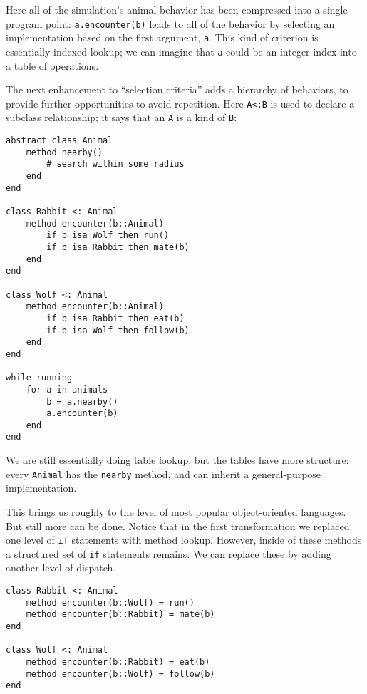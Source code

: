 Here all of the simulation's animal behavior has been
compressed into a single program point: \texttt{a.encounter(b)}
leads to all of the behavior by selecting an implementation based
on the first argument, \texttt{a}.
This kind of criterion is essentially indexed lookup; we can imagine
that \texttt{a} could be an integer index into a table of operations.

The next enhancement to ``selection criteria'' adds a hierarchy
of behaviors, to provide further opportunities to avoid repetition.
Here \texttt{A<:B} is used to declare a subclass relationship; it
says that an \texttt{A} is a kind of \texttt{B}:

\vspace{-3ex}
\begin{singlespace}
\begin{verbatim}
abstract class Animal
    method nearby()
        # search within some radius
    end
end

class Rabbit <: Animal
    method encounter(b::Animal)
        if b isa Wolf then run()
        if b isa Rabbit then mate(b)
    end
end

class Wolf <: Animal
    method encounter(b::Animal)
        if b isa Rabbit then eat(b)
        if b isa Wolf then follow(b)
    end
end

while running
    for a in animals
        b = a.nearby()
        a.encounter(b)
    end
end
\end{verbatim}
\end{singlespace}

We are still essentially doing table lookup, but the tables have
more structure: every \texttt{Animal} has the \texttt{nearby}
method, and can inherit a general-purpose implementation.

This brings us roughly to the level of most popular object-oriented
languages.
But still more can be done.
Notice that in the first transformation we replaced one level of \texttt{if}
statements with method lookup.
However, inside of these methods a structured set of \texttt{if} statements
remains.
We can replace these by adding another level of dispatch.

\vspace{-3ex}
\begin{singlespace}
\begin{verbatim}
class Rabbit <: Animal
    method encounter(b::Wolf) = run()
    method encounter(b::Rabbit) = mate(b)
end

class Wolf <: Animal
    method encounter(b::Rabbit) = eat(b)
    method encounter(b::Wolf) = follow(b)
end
\end{verbatim}
\end{singlespace}

